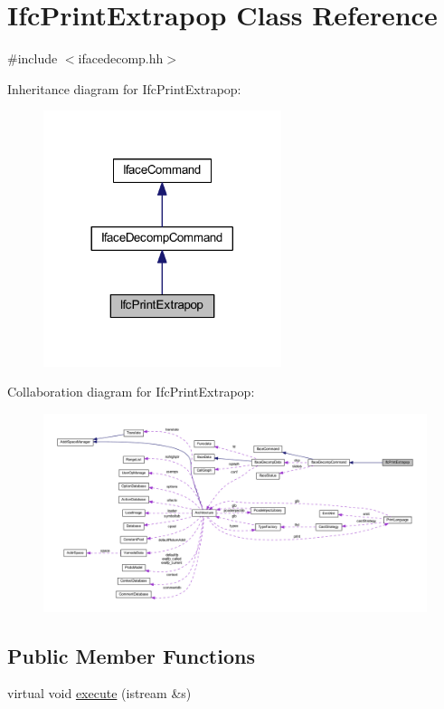 \hypertarget{class_ifc_print_extrapop}{}\section{Ifc\+Print\+Extrapop Class Reference}
\label{class_ifc_print_extrapop}


{\ttfamily \#include $<$ifacedecomp.\+hh$>$}



Inheritance diagram for Ifc\+Print\+Extrapop\+:
\nopagebreak
\begin{figure}[H]
\begin{center}
\leavevmode
\includegraphics[width=197pt]{class_ifc_print_extrapop__inherit__graph}
\end{center}
\end{figure}


Collaboration diagram for Ifc\+Print\+Extrapop\+:
\nopagebreak
\begin{figure}[H]
\begin{center}
\leavevmode
\includegraphics[width=350pt]{class_ifc_print_extrapop__coll__graph}
\end{center}
\end{figure}
\subsection*{Public Member Functions}
\begin{DoxyCompactItemize}
\item 
virtual void \mbox{\hyperlink{class_ifc_print_extrapop_a57b328ffae6e3282b8cf789b702ba496}{execute}} (istream \&s)
\end{DoxyCompactItemize}
